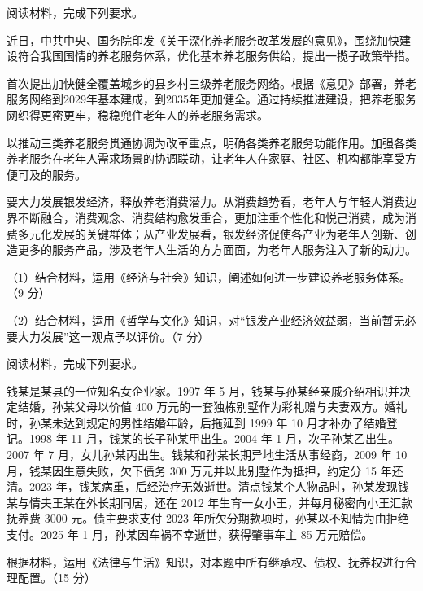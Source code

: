 \documentclass{exam-zh}
\newenvironment{kaiti-indented}{
  \parindent=2em
  \CJKfamily{zhkai}
  \setstretch{1.4}
}{
}
\begin{document}
\begin{question}
  阅读材料，完成下列要求。

  \begin{kaiti-indented}
    近日，中共中央、国务院印发《关于深化养老服务改革发展的意见》，围绕加快建设符合我国国情的养老服务体系，优化基本养老服务供给，提出一揽子政策举措。

    首次提出加快健全覆盖城乡的县乡村三级养老服务网络。根据《意见》部署，养老服务网络到2029年基本建成，到2035年更加健全。通过持续推进建设，把养老服务网织得更密更牢，稳稳兜住老年人的养老服务需求。

    以推动三类养老服务贯通协调为改革重点，明确各类养老服务功能作用。加强各类养老服务在老年人需求场景的协调联动，让老年人在家庭、社区、机构都能享受方便可及的服务。

    要大力发展银发经济，释放养老消费潜力。从消费趋势看，老年人与年轻人消费边界不断融合，消费观念、消费结构愈发重合，更加注重个性化和悦己消费，成为消费多元化发展的关键群体；从产业发展看，银发经济促使各产业为老年人创新、创造更多的服务产品，涉及老年人生活的方方面面，为老年人服务注入了新的动力。
  \end{kaiti-indented}

  （1）结合材料，运用《经济与社会》知识，阐述如何进一步建设养老服务体系。（9 分）

  （2）结合材料，运用《哲学与文化》知识，对“银发产业经济效益弱，当前暂无必要大力发展”这一观点予以评价。（7 分）
\end{question}

\begin{question}
  阅读材料，完成下列要求。

  \begin{kaiti-indented}
    钱某是某县的一位知名女企业家。1997 年 5 月，钱某与孙某经亲戚介绍相识并决定结婚，孙某父母以价值 400 万元的一套独栋别墅作为彩礼赠与夫妻双方。婚礼时，孙某未达到规定的男性结婚年龄，后拖延到 1999 年 10 月才补办了结婚登记。1998 年 11 月，钱某的长子孙某甲出生。2004 年 1 月，次子孙某乙出生。2007 年 7 月，女儿孙某丙出生。钱某和孙某长期异地生活从事经商，2009 年 10 月，钱某因生意失败，欠下债务 300 万元并以此别墅作为抵押，约定分 15 年还清。2023 年，钱某病重，后经治疗无效逝世。清点钱某个人物品时，孙某发现钱某与情夫王某在外长期同居，还在 2012 年生育一女小王，并每月秘密向小王汇款抚养费 3000 元。债主要求支付 2023 年所欠分期款项时，孙某以不知情为由拒绝支付。2025 年 1 月，孙某因车祸不幸逝世，获得肇事车主 85 万元赔偿。
  \end{kaiti-indented}

  根据材料，运用《法律与生活》知识，对本题中所有继承权、债权、抚养权进行合理配置。（15 分）
\end{question}
\end{document}
